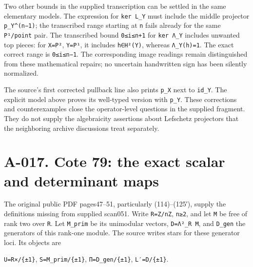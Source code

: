 \documentclass[
  10pt,
]{article}
\begin{document}
Two other bounds in the supplied transcription can be settled in the
same elementary models. The expression for
\texttt{\small ker L\_\allowbreak{}Y} must include the middle projector
\texttt{\small p\_\allowbreak{}Y\textasciicircum{}(\allowbreak{}n−1)\allowbreak{}};
the transcribed range starting at \texttt{\small n} fails already for
the same \texttt{\small P¹/\allowbreak{}point} pair. The transcribed
bound \texttt{\small 0≤\allowbreak{}i≤\allowbreak{}n+\allowbreak{}1} for
\texttt{\small ker Λ\_\allowbreak{}Y} includes unwanted top pieces: for
\texttt{\small X=\allowbreak{}P²}, \texttt{\small Y=\allowbreak{}P¹}, it
includes \texttt{\small h∈H²(\allowbreak{}Y)\allowbreak{}}, whereas
\texttt{\small Λ\_\allowbreak{}Y(\allowbreak{}h)\allowbreak{}=\allowbreak{}1}.
The exact correct range is
\texttt{\small 0≤\allowbreak{}i≤\allowbreak{}n−1}. The corresponding
image readings remain distinguished from these mathematical repairs; no
uncertain handwritten sign has been silently normalized.

The source's first corrected pullback line also prints
\texttt{\small p\_\allowbreak{}X} next to
\texttt{\small id\_\allowbreak{}Y}. The explicit model above proves its
well-typed version with \texttt{\small p\_\allowbreak{}Y}. These
corrections and counterexamples close the operator-level questions in
the supplied fragment. They do not supply the algebraicity assertions
about Lefschetz projectors that the neighboring archive discussions
treat separately.

\section{A-017. Cote 79: the exact scalar and determinant
maps}\label{a-017.-cote-79-the-exact-scalar-and-determinant-maps}

The original public PDF pages47--51, particularly (114)--(125′), supply
the definitions missing from supplied scan051. Write
\texttt{\small R=\allowbreak{}Z/\allowbreak{}nZ},
\texttt{\small n≥\allowbreak{}2}, and let \texttt{\small M} be free of
rank two over \texttt{\small R}. Let
\texttt{\small M\_\allowbreak{}prim} be its unimodular vectors,
\texttt{\small D=\allowbreak{}Λ²\_\allowbreak{}R M}, and
\texttt{\small D\_\allowbreak{}gen} the generators of this rank-one
module. The source writes stars for these generator loci. Its objects
are

\texttt{\small U=\allowbreak{}R×/\allowbreak{}\{±1\}},
\texttt{\small S=\allowbreak{}M\_\allowbreak{}prim/\allowbreak{}\{±1\}},
\texttt{\small Π=\allowbreak{}D\_\allowbreak{}gen/\allowbreak{}\{±1\}},
\texttt{\small L′=\allowbreak{}D/\allowbreak{}\{±1\}}.
\end{document}
